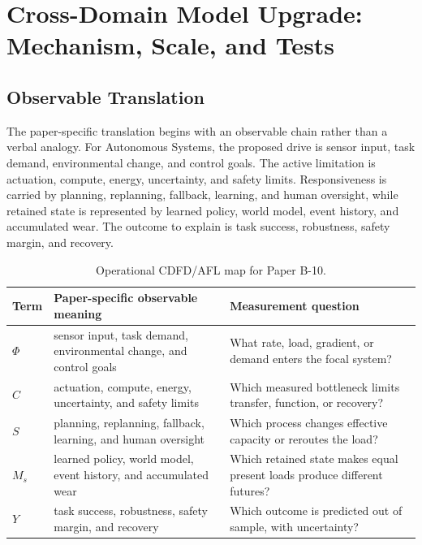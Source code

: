 \documentclass[11pt,a4paper]{article}
\begin{document}
\section{Cross-Domain Model Upgrade: Mechanism, Scale, and Tests}

\subsection{Observable Translation}

The paper-specific translation begins with an observable chain rather than a
verbal analogy. For Autonomous Systems, the proposed drive is sensor input, task demand, environmental change, and control goals.
The active limitation is actuation, compute, energy, uncertainty, and safety limits. Responsiveness is carried by
planning, replanning, fallback, learning, and human oversight, while retained state is represented by
learned policy, world model, event history, and accumulated wear. The outcome to explain is task success, robustness, safety margin, and recovery.

\begin{table}[htbp]
\centering
\small
\caption{Operational CDFD/AFL map for Paper B-10.}
\begin{tabularx}{\textwidth}{|l|X|X|}
\hline
\textbf{Term} & \textbf{Paper-specific observable meaning} & \textbf{Measurement question} \\
\hline
$\Phi$ & sensor input, task demand, environmental change, and control goals & What rate, load, gradient, or demand enters the focal system? \\
\hline
$C$ & actuation, compute, energy, uncertainty, and safety limits & Which measured bottleneck limits transfer, function, or recovery? \\
\hline
$S$ & planning, replanning, fallback, learning, and human oversight & Which process changes effective capacity or reroutes the load? \\
\hline
$M_s$ & learned policy, world model, event history, and accumulated wear & Which retained state makes equal present loads produce different futures? \\
\hline
$Y$ & task success, robustness, safety margin, and recovery & Which outcome is predicted out of sample, with uncertainty? \\
\hline
\end{tabularx}
\end{table}
\end{document}
